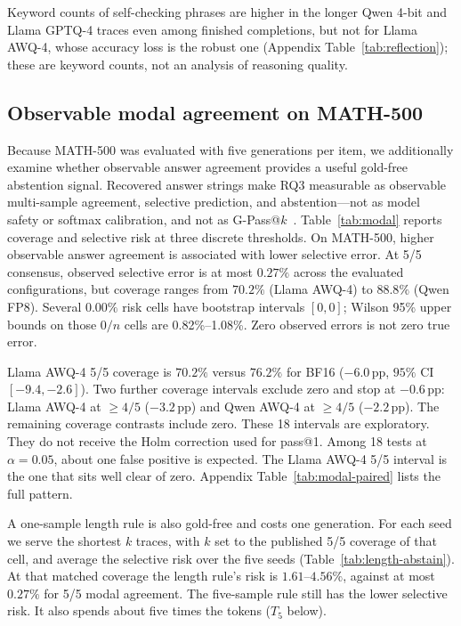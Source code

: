 \documentclass[11pt,a4paper]{article}
\begin{document}
Keyword counts of self-checking phrases are higher in the longer Qwen 4-bit and Llama GPTQ-4 traces even among finished completions, but not for Llama AWQ-4, whose accuracy loss is the robust one (Appendix Table~\ref{tab:reflection}); these are keyword counts, not an analysis of reasoning quality.

\subsection{Observable modal agreement on MATH-500}
\label{sec:modal}
Because MATH-500 was evaluated with five generations per item, we additionally examine whether observable answer agreement provides a useful gold-free abstention signal. Recovered answer strings make RQ3 measurable as observable multi-sample agreement, selective prediction, and abstention---not as model safety or softmax calibration, and not as G-Pass@$k$~\cite{liu2025gpass}. Table~\ref{tab:modal} reports coverage and selective risk at three discrete thresholds. On MATH-500, higher observable answer agreement is associated with lower selective error. At 5/5 consensus, observed selective error is at most $0.27\%$ across the evaluated configurations, but coverage ranges from $70.2\%$ (Llama AWQ-4) to $88.8\%$ (Qwen FP8). Several $0.00\%$ risk cells have bootstrap intervals $[0,0]$; Wilson 95\% upper bounds on those $0/n$ cells are 0.82\%--1.08\%. Zero observed errors is not zero true error.

Llama AWQ-4 5/5 coverage is $70.2\%$ versus $76.2\%$ for BF16 ($-6.0$\,pp, $95\%$ CI $[-9.4,-2.6]$). Two further coverage intervals exclude zero and stop at $-0.6$\,pp: Llama AWQ-4 at $\ge 4/5$ ($-3.2$\,pp) and Qwen AWQ-4 at $\ge 4/5$ ($-2.2$\,pp). The remaining coverage contrasts include zero. These 18 intervals are exploratory. They do not receive the Holm correction used for pass@1. Among 18 tests at $\alpha=0.05$, about one false positive is expected. The Llama AWQ-4 5/5 interval is the one that sits well clear of zero. Appendix Table~\ref{tab:modal-paired} lists the full pattern.

A one-sample length rule is also gold-free and costs one generation. For each seed we serve the shortest $k$ traces, with $k$ set to the published 5/5 coverage of that cell, and average the selective risk over the five seeds (Table~\ref{tab:length-abstain}). At that matched coverage the length rule's risk is $1.61$--$4.56\%$, against at most $0.27\%$ for 5/5 modal agreement. The five-sample rule still has the lower selective risk. It also spends about five times the tokens ($T_5$ below).
\end{document}
